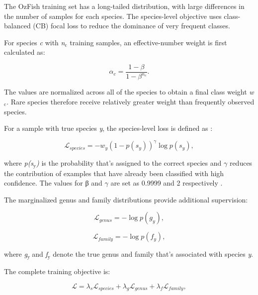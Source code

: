 \documentclass[preprint,12pt]{elsarticle}
\providecommand{\textsubscript}[1]{\ensuremath{_{\text{#1}}}}
\begin{document}
The OzFish training set has a long-tailed distribution, with large
differences in the number of samples for each species. The species-level
objective uses class-balanced (CB) focal loss
\citep{ref14,ref63} to reduce the dominance of very
frequent classes.

For species \emph{c} with \emph{n\textsubscript{c}} training samples, an
effective-number weight is first calculated
as\citep{ref14}:

\begin{equation}
\alpha_c = \frac{1-\beta}{1-\beta^{n_c}}.
\label{eq:effective-number-weight}
\end{equation}

The values are normalized across all of the species to obtain a final
class weight \emph{w\textsubscript{c}}. Rare species therefore receive
relatively greater weight than frequently observed species.

For a sample with true species \emph{y}, the species-level loss is
defined as \citep{ref14,ref63}:

\begin{equation}
\mathcal{L}_{species} = -w_y\left(1-p(s_y)\right)^{\gamma}\log p(s_y),
\label{eq:species-loss}
\end{equation}

where \emph{p(s\textsubscript{y})} is the probability that's assigned to
the correct species and \(\gamma\) reduces the contribution of examples
that have already been classified with high confidence. The values for β
and \(\gamma\) are set as 0.9999 and 2 respectively
\citep{ref14,ref63}.

The marginalized genus and family distributions provide additional
supervision:

\begin{equation}
\mathcal{L}_{genus} = -\log p(g_y),
\label{eq:genus-loss}
\end{equation}

\begin{equation}
\mathcal{L}_{family} = -\log p(f_y),
\label{eq:family-loss}
\end{equation}

where \emph{g\textsubscript{y }}and \emph{f\textsubscript{y}} denote the
true genus and family that's associated with species \emph{y}.

The complete training objective is:

\begin{equation}
\mathcal{L} = \lambda_s\mathcal{L}_{species} + \lambda_g\mathcal{L}_{genus} + \lambda_f\mathcal{L}_{family},
\label{eq:training-objective}
\end{equation}
\end{document}
